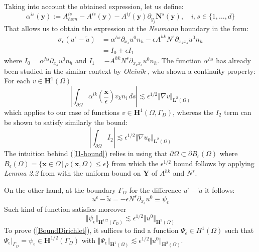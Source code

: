 Taking into account the obtained expression, let us define:
\begin{equation*}
    \alpha^{is}(\mathbf{y}) := A^{is}_{hom} - A^{is}(\mathbf{y}) - A^{ij}(\mathbf{y}) \partial_{y_j} \mathbf{N}^s(\mathbf{y}), \quad i,s \in \{1,\dots, d\}
\end{equation*}
That allows us to obtain the expression at the \textit{Neumann} boundary in the form:
\begin{equation}
    \label{NeumannExp}
    \begin{aligned}
    \sigma_{\epsilon} (u^{\epsilon}-\tilde{u}) &= \alpha^{hs} \partial_{x_s} u^0 n_h - \epsilon A^{hk}N^s \partial_{x_k x_s} u^0 n_h \\
    & = I_0 + \epsilon I_1
    \end{aligned}
\end{equation}
where $I_0 = \alpha^{hs} \partial_{x_s} u^0 n_h$ and $I_1= -A^{hk}N^s \partial_{x_k x_s} u^0 n_h$. 
The function $\alpha^{hs}$ has already been studied in the similar context by \textit{Oleinik} \cite{oleinik1992mathematical}, who shown a continuity property: For each $v \in \mathbf{H}^1(\Omega)$ 
\begin{equation}
    \label{OleinikLemma2.2}
    \left \vert \int_{\partial \Omega} \alpha^{ik}(\frac{\mathbf{x}}{\epsilon}) v_k n_i \,ds \right \vert \lesssim\epsilon^{1/2} \Vert \nabla v \Vert_{\mathbf{L}^2(\Omega)}
\end{equation}
which applies to our case of functions $v \in \mathbf{H}^1(\Omega, \Gamma_D)$, whereas the $I_2$ term can be shown to satisfy similarly the bound:
\begin{equation}
    \label{I1-bound}
    \left \vert \int_{\partial \Omega} I_2 \right \vert \lesssim \epsilon^{1/2} \Vert \nabla u_0 \Vert_{\mathbf{L}^2(\Omega)}
\end{equation}
The intuition behind  (\ref{I1-bound}) relies in using that $\partial \Omega \subset \partial B_{\epsilon}(\Omega)$ where $B_{\epsilon}(\Omega) = \{ \mathbf{x} \in \Omega \, \vert \, \rho(\mathbf{x}, \Omega) \leq \epsilon \}$ from which the $\epsilon^{1/2}$ bound follows by applying \textit{Lemma 2.2} from \cite{oleinik1992mathematical} with the uniform bound on $\mathbf{Y}$ of $A^{hk}$ and $N^s$.


On the other hand, at the boundary $\Gamma_D$ for the difference $u^{\epsilon} - \tilde{u}$ it follows:
\begin{equation*}
    u^{\epsilon} - \tilde{u} = - \epsilon N^s \partial_{x_s}u^0 \equiv \psi_{\epsilon}
\end{equation*} 
Such kind of function satisfies moreover
\begin{equation}
    \label{BoundDirichlet}
    \Vert \psi_{\epsilon} \Vert_{\mathbf{H}^{1/2}(\Gamma_D)} \lesssim \epsilon^{1/2} \Vert u^0 \Vert_{\mathbf{H}^2(\Omega)}
\end{equation} 
To prove (\ref{BoundDirichlet}), it suffices to find a function $\Psi_{\epsilon} \in H^1(\Omega)$ such that $\Psi_{\epsilon} \vert_{\Gamma_D} = \psi_{\epsilon} \in \mathbf{H}^{1/2}(\Gamma_D)$ with $\Vert \Psi_{\epsilon} \Vert_{\mathbf{H}^1(\Omega)} \lesssim \epsilon^{1/2} \Vert u^0 \Vert_{\mathbf{H}^2(\Omega)}$.

